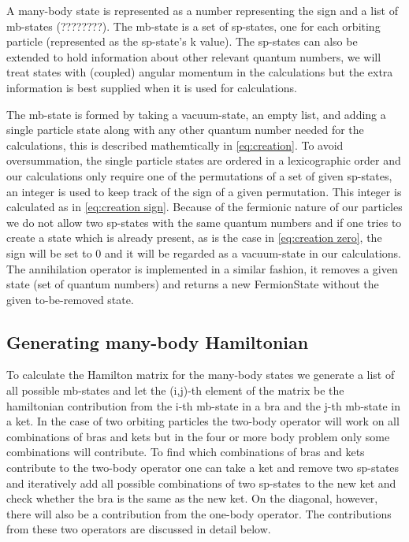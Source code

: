 A many-body state is represented as a number representing the sign and a list of mb-states (????????).
 The mb-state is a set of sp-states, one for each orbiting particle (represented as the sp-state's k value). 
 The sp-states can also be extended to hold information about other relevant quantum numbers, we will treat states with (coupled) angular momentum in the calculations but the extra information is best supplied when it is used for calculations.
 
 
 

The mb-state is formed by taking a vacuum-state, an empty list, and adding a single particle state along with any other quantum number needed for the calculations, this is described mathemtically in \cref{eq:creation}.
To avoid oversummation, the single particle states are ordered in a lexicographic order and our calculations only require one of the permutations of a set of given sp-states, an integer is used to keep track of the sign of a given permutation. 
This integer is calculated as in \cref{eq:creation sign}.
Because of the fermionic nature of our particles we do not allow two sp-states with the same quantum numbers and if one tries to create a state which is already present, as is the case in \cref{eq:creation zero}, the sign will be set to 0 and it will be regarded as a vacuum-state in our calculations.
The annihilation operator is implemented in a similar fashion, it removes a given state (set of quantum numbers) and returns a new FermionState without the given to-be-removed state.
 
 
\subsection{Generating many-body Hamiltonian}
To calculate the Hamilton matrix for the many-body states we generate a list of all possible mb-states and let the (i,j)-th element of the matrix be the hamiltonian contribution from the i-th mb-state in a bra and the j-th mb-state in a ket. 
 In the case of two orbiting particles the two-body operator will work on all combinations of bras and kets but in the four or more body problem only some combinations will contribute.
 To find which combinations of bras and kets contribute to the two-body operator one can take a ket and remove two sp-states and iteratively add all possible combinations of two sp-states to the new ket and check whether the bra is the same as the new ket.
 On the diagonal, however, there will also be a contribution from the one-body operator.
 The contributions from these two operators are discussed in detail below.

